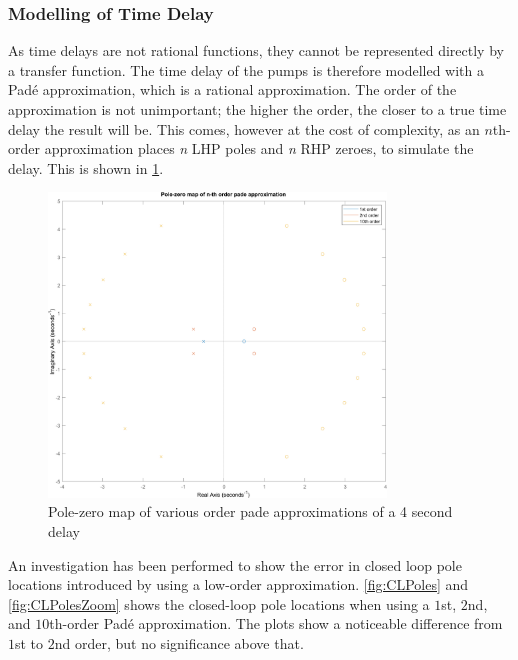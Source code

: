 \subsubsection{Modelling of Time Delay}
As time delays are not rational functions, they cannot be represented directly by a transfer function. The time delay of the pumps is therefore modelled with a Padé approximation, which is a rational approximation. The order of the approximation is not unimportant; the higher the order, the closer to a true time delay the result will be. This comes, however at the cost of complexity, as an $n$th-order approximation places \textit{n} LHP poles and \textit{n} RHP zeroes, to simulate the delay. This is shown in \cref{fig:PadeApprox}.
\begin{figure}[h!]
	\centering
	\includegraphics[width=0.8\textwidth]{Pictures/PadeApprox.png}
	\caption{Pole-zero map of various order pade approximations of a 4 second delay}
	\label{fig:PadeApprox}
\end{figure}

An investigation has been performed to show the error in closed loop pole locations introduced by using a low-order approximation. \cref{fig:CLPoles} and \cref{fig:CLPolesZoom} shows the closed-loop pole locations when using a $1$st, $2$nd, and $10$th-order Padé approximation. The plots show a noticeable difference from $1$st to $2$nd order, but no significance above that.

